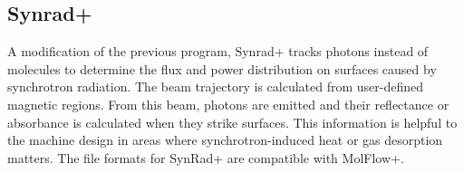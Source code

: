 \subsection{Synrad+}

A modification of the previous program, Synrad+ tracks photons instead of molecules to determine the flux and power distribution on surfaces caused by synchrotron radiation.  The beam trajectory is calculated from user-defined magnetic regions.  From this beam, photons are emitted and their reflectance or absorbance is calculated when they strike surfaces. This information is helpful to the machine design in areas where synchrotron-induced heat or gas desorption matters.  The file formats for SynRad+ are compatible with MolFlow+.

